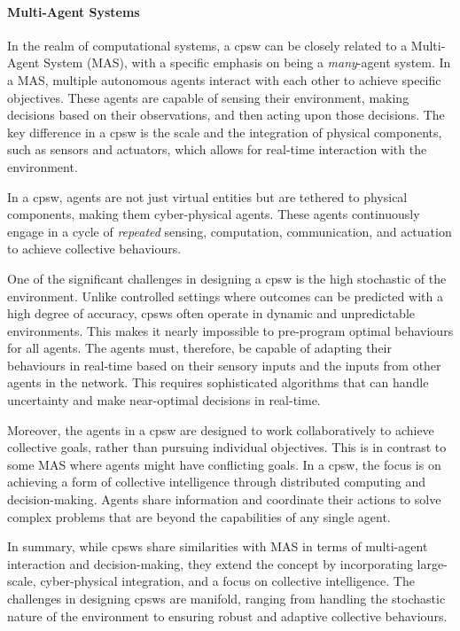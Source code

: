 \paragraph*{Multi-Agent Systems}
In the realm of computational systems, a \ac{cpsw} can be closely related to a Multi-Agent System (MAS), 
 with a specific emphasis on being a \emph{many}-agent system. 
 In a MAS, multiple autonomous agents interact with each other to achieve specific objectives. 
 These agents are capable of sensing their environment, making decisions based on their observations, and then acting upon those decisions. 
 The key difference in a \ac{cpsw} is the scale and the integration of physical components, such as sensors and actuators, which allows for real-time interaction with the environment.

In a \ac{cpsw}, agents are not just virtual entities but are tethered to physical components, making them cyber-physical agents. 
 These agents continuously engage in a cycle of \emph{repeated} sensing, computation, communication, and actuation to achieve collective behaviours. 

One of the significant challenges in designing a \ac{cpsw} is the high stochastic of the environment. 
 Unlike controlled settings where outcomes can be predicted with a high degree of accuracy, \acp{cpsw} often operate in dynamic and unpredictable environments. 
 This makes it nearly impossible to pre-program optimal behaviours for all agents. 
 The agents must, therefore, be capable of adapting their behaviours in real-time based on their sensory inputs and the inputs from other agents in the network. 
 This requires sophisticated algorithms that can handle uncertainty and make near-optimal decisions in real-time.

Moreover, the agents in a \ac{cpsw} are designed to work collaboratively to achieve collective goals, 
 rather than pursuing individual objectives. 
 This is in contrast to some MAS where agents might have conflicting goals. 
 In a \ac{cpsw}, the focus is on achieving a form of collective intelligence through distributed computing and decision-making. 
 Agents share information and coordinate their actions to solve complex problems that are beyond the capabilities of any single agent.

In summary, while \acp{cpsw} share similarities with MAS in terms of multi-agent interaction and decision-making, they extend the concept by incorporating large-scale, cyber-physical integration, and a focus on collective intelligence. 
 The challenges in designing \acp{cpsw} are manifold, ranging from handling the stochastic nature of the environment to ensuring robust and adaptive collective behaviours.

